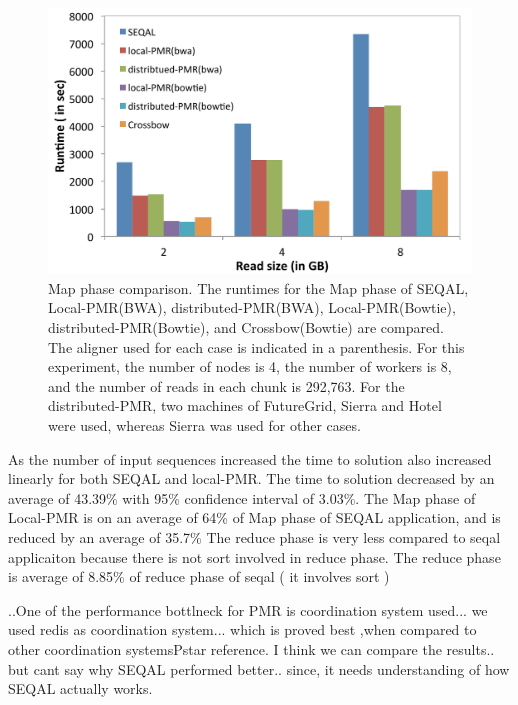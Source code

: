 \documentclass{sig-alternate}
\begin{document}
\begin{figure} 
 \centering
\includegraphics[scale=0.40]{figures/map_comp.pdf}
\caption{\small  Map phase comparison.  The runtimes for the Map phase of SEQAL, Local-PMR(BWA), distributed-PMR(BWA), Local-PMR(Bowtie), distributed-PMR(Bowtie), and Crossbow(Bowtie) are compared.  The aligner used for each case is indicated in a parenthesis.  For this experiment, the number of nodes is 4, the number of workers is 8, and the number of reads in each chunk is 292,763.  For the distributed-PMR, two machines of FutureGrid, Sierra and Hotel were used, whereas Sierra was used for other cases.}
  \label{fig:tool_comp} 
\end{figure}




As the number of input sequences increased the time to solution also increased linearly for both SEQAL and local-PMR. 
The time to solution decreased by an average of 43.39\% with 95\% confidence interval of 3.03\%. The Map phase of Local-PMR is on an average of 64\% of Map phase of SEQAL application, and is reduced by an average of 35.7\%
The reduce phase is very less compared to seqal applicaiton because there is not sort involved in reduce phase.
The reduce phase is average of 8.85\% of reduce phase of seqal  ( it involves sort )

..One of the performance bottlneck for PMR is coordination system used... we used redis as coordination system... which is proved best ,when compared to other coordination systems{Pstar reference}. I think we can compare the results.. but cant say why SEQAL performed better.. since, it needs understanding of how SEQAL actually works.
\end{document}
